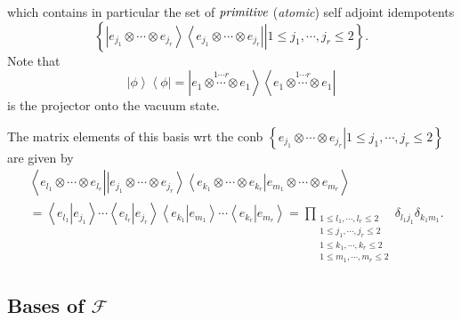 \documentclass[aps,preprint]{revtex4}%
\begin{document}
which contains in particular the set of $\emph{primitive}$ (\emph{atomic})
self adjoint idempotents
\begin{equation}
\left\{  \left.  \left\vert e_{j_{1}}\otimes\cdots\otimes e_{j_{r}%
}\right\rangle \left\langle e_{j_{1}}\otimes\cdots\otimes e_{j_{r}}\right\vert
\right\vert 1\leq j_{1},\cdots,j_{r}\leq2\right\}  .
\end{equation}
Note that
\begin{equation}
\left\vert \phi\right\rangle \left\langle \phi\right\vert =\left\vert
\overset{1\cdots r}{e_{1}\otimes\cdots\otimes e_{1}}\right\rangle \left\langle
\overset{1\cdots r}{e_{1}\otimes\cdots\otimes e_{1}}\right\vert
\end{equation}
is the projector onto the vacuum state.

The matrix elements of this basis wrt the conb $\left\{  \left.  e_{j_{1}%
}\otimes\cdots\otimes e_{j_{r}}\right\vert 1\leq j_{1},\cdots,j_{r}%
\leq2\right\}  $ are given by
\begin{align}
&  \left\langle e_{l_{1}}\otimes\cdots\otimes e_{l_{r}}\left\vert \left\vert
e_{j_{1}}\otimes\cdots\otimes e_{j_{r}}\right\rangle \left\langle e_{k_{1}%
}\otimes\cdots\otimes e_{k_{r}}\right\vert e_{m_{1}}\otimes\cdots\otimes
e_{m_{r}}\right.  \right\rangle \nonumber\\
&  =\left\langle e_{l_{1}}\left\vert e_{j_{1}}\right.  \right\rangle
\cdots\left\langle e_{l_{r}}\left\vert e_{j_{r}}\right.  \right\rangle
\left\langle e_{k_{1}}\left\vert e_{m_{1}}\right.  \right\rangle
\cdots\left\langle e_{k_{r}}\left\vert e_{m_{r}}\right.  \right\rangle =%
{\displaystyle\prod\limits_{\substack{1\leq l_{1},\cdots,l_{r}\leq2\\1\leq
j_{1},\cdots,j_{r}\leq2\\1\leq k_{1},\cdots,k_{r}\leq2\\1\leq m_{1}%
,\cdots,m_{r}\leq2}}}
\delta_{l_{1}j_{1}}\delta_{k_{1}m_{1}}.
\end{align}


\subsection{Bases of $\mathcal{F}$}
\end{document}
